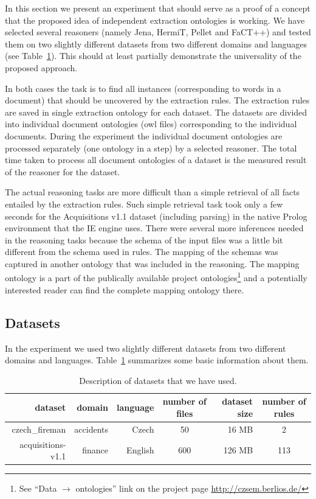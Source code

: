 \documentclass[10pt, conference, compsocconf]{IEEEtran}
\begin{document}
In this section we present an experiment that should serve as a proof of a concept that the proposed idea of independent extraction ontologies is working. We have selected several reasoners (namely Jena, HermiT, Pellet and FaCT++) and tested them on two slightly different datasets from two different domains and languages (see Table~\ref{tab:datasets}). This should at least partially demonstrate the universality of the proposed approach.

In both cases the task is to find all instances (corresponding to words in a document) that should be uncovered by the extraction rules. The extraction rules are saved in single extraction ontology for each dataset. The datasets are divided into individual document ontologies (owl files) corresponding to the individual documents. During the experiment the individual document ontologies are processed separately (one ontology in a step) by a selected reasoner. The total time taken to process all document ontologies of a dataset is the measured result of the reasoner for the dataset.

The actual reasoning tasks are more difficult than a simple retrieval of all facts entailed by the extraction rules. Such simple retrieval task took only a few seconds for the Acquisitions v1.1 dataset (including parsing) in the native Prolog environment that the IE engine uses. There were several more inferences needed in the reasoning tasks because the schema of the input files was a little bit different from the schema used in rules. The mapping of the schemas was captured in another ontology that was included in the reasoning. The mapping ontology is a part of the publically available project ontologies\footnote{See ``Data $\rightarrow$ ontologies'' link on the project page \url{http://czsem.berlios.de/}} and a potentially interested reader can find the complete mapping ontology there.


\subsection{Datasets}

In the experiment we used two slightly different datasets from two different domains and languages.  Table~\ref{tab:datasets} summarizes some basic information about them.

\begin{table}
\centering
\begin{tabular}{|r||r|r|c|r|c|}
\hline
dataset & domain & language & number of files & dataset size & number of rules\\
\hline
\hline
czech\_fireman & accidents & Czech & 50 & 16 MB & 2\\
\hline
acquisitions-v1.1 & finance & English & 600 & 126 MB & 113\\
\hline
\end{tabular}
\caption{Description of datasets that we have used.}
\label{tab:datasets}
\end{table}
\end{document}
